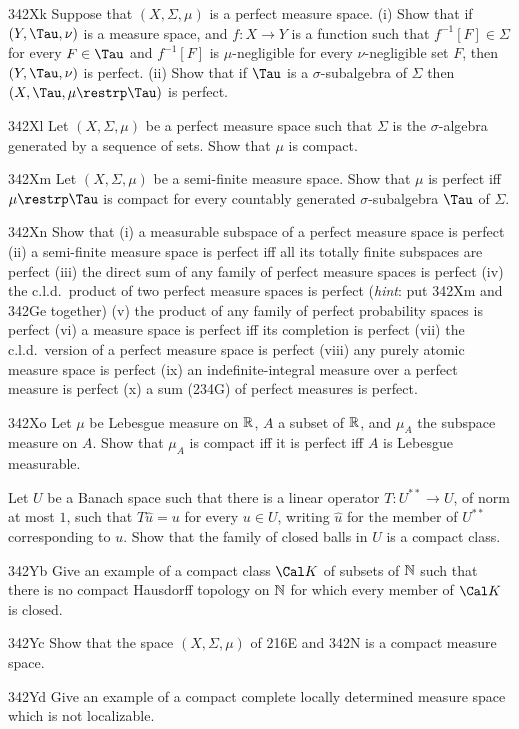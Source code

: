 {\spheader 342Xk Suppose that $(X,\Sigma,\mu)$ is a perfect measure
space.   (i) Show that if $(Y,\Tau,\nu)$ is a measure space, and $f:X\to
Y$ is a function such that $f^{-1}[F]\in\Sigma$ for every $F\in\Tau$ and
$f^{-1}[F]$ is $\mu$-negligible for every $\nu$-negligible set
$F$, then $(Y,\Tau,\nu)$ is perfect.   (ii) Show that if $\Tau$ is a
$\sigma$-subalgebra of $\Sigma$ then $(X,\Tau,\mu\restrp\Tau)$ is
perfect.

\spheader 342Xl Let $(X,\Sigma,\mu)$ be a perfect measure space such
that $\Sigma$ is the $\sigma$-algebra generated by a sequence of sets.
Show that $\mu$ is compact.   

\spheader 342Xm Let $(X,\Sigma,\mu)$ be a
semi-finite measure space.   Show that $\mu$
is perfect iff $\mu\restrp\Tau$ is compact for every countably generated
$\sigma$-subalgebra $\Tau$ of $\Sigma$.

\spheader 342Xn Show that (i) a measurable subspace of a perfect measure
space is perfect (ii) a semi-finite measure space is perfect iff all its
totally finite subspaces are perfect (iii) the direct sum of any family
of perfect measure spaces is perfect (iv) the c.l.d.\ product of two
perfect measure spaces is perfect ({\it hint\/}: put 342Xm and 342Ge
together) (v) the product of any family of
perfect probability spaces is perfect (vi) a measure space is perfect
iff its completion is perfect (vii) the c.l.d.\ version of a perfect
measure space is perfect (viii) any purely atomic measure space is
perfect (ix) an indefinite-integral measure over a perfect measure is
perfect (x) a sum (234G\Latereditions) of perfect measures
is perfect.

\spheader 342Xo Let $\mu$ be Lebesgue measure on $\Bbb R$, $A$ a
subset of $\Bbb R$, and $\mu_A$ the subspace measure on $A$.   Show that
$\mu_A$ is compact iff it is perfect iff $A$ is Lebesgue measurable.

Let $U$ be a Banach space such that there is a linear
operator $T:U^{**}\to U$, of norm at most $1$, such that $T\hat u=u$ for
every $u\in U$, writing $\hat u$ for the member of $U^{**}$
corresponding to $u$.   Show that the family of closed balls in $U$ is a
compact class.

\spheader 342Yb Give an example of a compact class
$\Cal K$ of subsets of $\Bbb N$
such that there is no compact Hausdorff topology on $\Bbb N$ for which
every member of $\Cal K$ is closed.

\spheader 342Yc
Show that the space $(X,\Sigma,\mu)$ of 216E and 342N is a
compact measure space.   

\spheader 342Yd Give an example of a compact complete locally
determined measure space which is not localizable.   
}%
